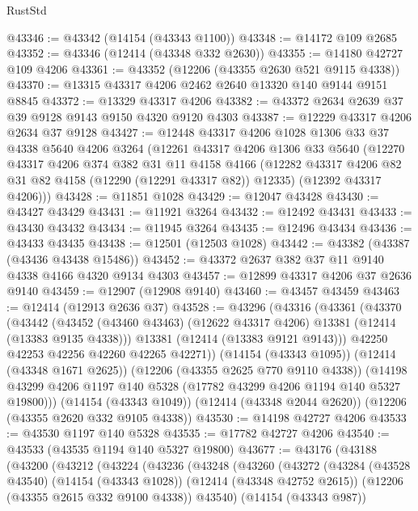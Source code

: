 \begin{lexlean}{RustStd}
\begin{coremodule}
{\begin{coremodule}
{{{{{{{{{{{{{{{{{{{{{{{{{{{{{{{{{{{{{{{{{{{{{{{{{{@43346 := @43342 (@14154 (@43343 @1100))
@43348 := @14172 @109 @2685
@43352 := @43346 (@12414 (@43348 @332 @2630))
@43355 := @14180 @42727 @109 @4206
@43361 := @43352 (@12206 (@43355 @2630 @521 @9115 @4338))
@43370 := @13315 @43317 @4206 @2462 @2640 @13320 @140 @9144 @9151 @8845
@43372 := @13329 @43317 @4206
@43382 := @43372 @2634 @2639 @37 @39 @9128 @9143 @9150 @4320 @9120 @4303
@43387 := @12229 @43317 @4206 @2634 @37 @9128
@43427 := @12448
    @43317
    @4206
    @1028
    @1306
    @33
    @37
    @4338
    @5640
    @4206
    @3264
    (@12261
      @43317
      @4206
      @1306
      @33
      @5640
      (@12270
        @43317
        @4206
        @374
        @382
        @31
        @11
        @4158
        @4166
        (@12282 @43317 @4206 @82 @31 @82 @4158 (@12290 (@12291 @43317 @82)) @12335)
        (@12392 @43317 @4206)))
@43428 := @11851 @1028
@43429 := @12047 @43428
@43430 := @43427 @43429
@43431 := @11921 @3264
@43432 := @12492 @43431
@43433 := @43430 @43432
@43434 := @11945 @3264
@43435 := @12496 @43434
@43436 := @43433 @43435
@43438 := @12501 (@12503 @1028)
@43442 := @43382 (@43387 (@43436 @43438 @15486))
@43452 := @43372 @2637 @382 @37 @11 @9140 @4338 @4166 @4320 @9134 @4303
@43457 := @12899 @43317 @4206 @37 @2636 @9140
@43459 := @12907 (@12908 @9140)
@43460 := @43457 @43459
@43463 := @12414 (@12913 @2636 @37)
@43528 := @43296
    (@43316
      (@43361
        (@43370
          (@43442
            (@43452 (@43460 @43463) (@12622 @43317 @4206) @13381 (@12414 (@13383 @9135 @4338)))
            @13381
            (@12414 (@13383 @9121 @9143)))
          @42250
          @42253
          @42256
          @42260
          @42265
          @42271))
      (@14154 (@43343 @1095))
      (@12414 (@43348 @1671 @2625))
      (@12206 (@43355 @2625 @770 @9110 @4338))
      (@14198 @43299 @4206 @1197 @140 @5328 (@17782 @43299 @4206 @1194 @140 @5327 @19800)))
    (@14154 (@43343 @1049))
    (@12414 (@43348 @2044 @2620))
    (@12206 (@43355 @2620 @332 @9105 @4338))
@43530 := @14198 @42727 @4206
@43533 := @43530 @1197 @140 @5328
@43535 := @17782 @42727 @4206
@43540 := @43533 (@43535 @1194 @140 @5327 @19800)
@43677 := @43176
    (@43188
      (@43200
        (@43212
          (@43224
            (@43236
              (@43248
                (@43260
                  (@43272
                    (@43284
                      (@43528 @43540)
                      (@14154 (@43343 @1028))
                      (@12414 (@43348 @42752 @2615))
                      (@12206 (@43355 @2615 @332 @9100 @4338))
                      @43540)
                    (@14154 (@43343 @987))
}}}}}}}}}}}}}}}}}}}}}}}}}}}}}}}}}}}}}}}}}}}}}}}}}}
\end{coremodule}}
\end{coremodule}
\end{lexlean}
